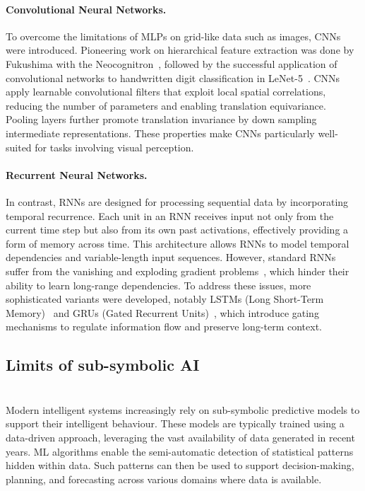 \paragraph{Convolutional Neural Networks.}
%
To overcome the limitations of \glspl{MLP} on grid-like data such as images, \glspl{CNN} were introduced.
%
Pioneering work on hierarchical feature extraction was done by Fukushima with the Neocognitron~\cite{fukushima1980neocognitron}, followed by the successful application of convolutional networks to handwritten digit classification in LeNet-5~\cite{lecun1998gradient}.
%
\glspl{CNN} apply learnable convolutional filters that exploit local spatial correlations, reducing the number of parameters and enabling translation equivariance.
%
Pooling layers further promote translation invariance by down sampling intermediate representations.
%
These properties make \glspl{CNN} particularly well-suited for tasks involving visual perception.

\paragraph{Recurrent Neural Networks.}
%
In contrast, \glspl{RNN} are designed for processing sequential data by incorporating temporal recurrence.
%
Each unit in an \gls{RNN} receives input not only from the current time step but also from its own past activations, effectively providing a form of memory across time.
%
This architecture allows \glspl{RNN} to model temporal dependencies and variable-length input sequences.
%
However, standard \glspl{RNN} suffer from the vanishing and exploding gradient problems~\cite{bengio1994learning}, which hinder their ability to learn long-range dependencies.
%
To address these issues, more sophisticated variants were developed, notably \glspl{LSTM} (Long Short-Term Memory)~\cite{hochreiter1997long} and \glspl{GRU} (Gated Recurrent Units)~\cite{cho2014learning}, which introduce gating mechanisms to regulate information flow and preserve long-term context.


\subsection[Limits of sub-symbolic AI]{Limits of sub-symbolic \Gls{AI}}\label{subsec:limits-of-sub-symbolic-ai}



\section[Explainable AI]{}\label{sec:xai}
%
Modern intelligent systems increasingly rely on sub-symbolic predictive models to support their intelligent behaviour.
%
These models are typically trained using a data-driven approach, leveraging the vast availability of data generated in recent years.
%
\Gls{ML} algorithms enable the semi-automatic detection of statistical patterns hidden within data.
%
Such patterns can then be used to support decision-making, planning, and forecasting across various domains where data is available.


